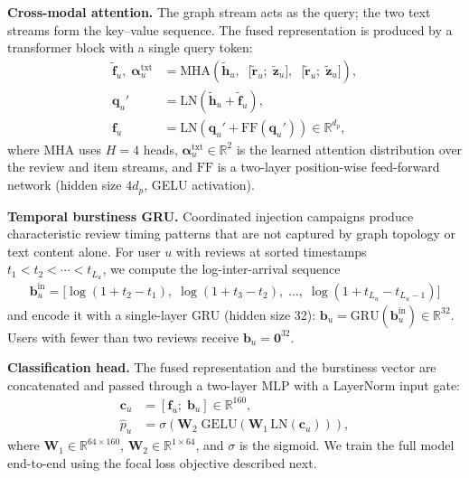 \textbf{Cross-modal attention.}
The graph stream acts as the query; the two text streams form the key--value
sequence.
The fused representation is produced by a transformer block with a single query
token:
\begin{align}
  \tilde{\mathbf{f}}_u,\; \boldsymbol{\alpha}_u^{\mathrm{txt}}
  &= \mathrm{MHA}\!\left(
       \tilde{\mathbf{h}}_u,\;\;
       \bigl[\tilde{\mathbf{r}}_u;\; \tilde{\mathbf{z}}_u\bigr],\;\;
       \bigl[\tilde{\mathbf{r}}_u;\; \tilde{\mathbf{z}}_u\bigr]
     \right), \label{eq:crossattn} \\[3pt]
  \mathbf{q}_u'
  &= \mathrm{LN}\!\left(\tilde{\mathbf{h}}_u + \tilde{\mathbf{f}}_u\right), \label{eq:addnorm1} \\
  \mathbf{f}_u
  &= \mathrm{LN}\!\left(\mathbf{q}_u' + \mathrm{FF}(\mathbf{q}_u')\right)
    \in \mathbb{R}^{d_p}, \label{eq:fusionout}
\end{align}
where $\mathrm{MHA}$ uses $H = 4$ heads, $\boldsymbol{\alpha}_u^{\mathrm{txt}}
\in \mathbb{R}^2$ is the learned attention distribution over the review and item
streams, and $\mathrm{FF}$ is a two-layer position-wise feed-forward network
(hidden size $4 d_p$, GELU activation).

\textbf{Temporal burstiness GRU.}
Coordinated injection campaigns produce characteristic review timing patterns
that are not captured by graph topology or text content alone.
For user $u$ with reviews at sorted timestamps $t_1 < t_2 < \cdots < t_{L_u}$,
we compute the log-inter-arrival sequence
\begin{align}
  \mathbf{b}_u^{\mathrm{in}}
  = \bigl[
      \log(1 + t_2 - t_1),\;
      \log(1 + t_3 - t_2),\;
      \ldots,\;
      \log(1 + t_{L_u} - t_{L_u - 1})
    \bigr]
  \label{eq:iat}
\end{align}
and encode it with a single-layer GRU (hidden size 32):
$\mathbf{b}_u = \mathrm{GRU}(\mathbf{b}_u^{\mathrm{in}}) \in \mathbb{R}^{32}$.
Users with fewer than two reviews receive $\mathbf{b}_u = \mathbf{0}^{32}$.

\textbf{Classification head.}
The fused representation and the burstiness vector are concatenated and passed
through a two-layer MLP with a LayerNorm input gate:
\begin{align}
  \mathbf{c}_u   &= [\mathbf{f}_u;\; \mathbf{b}_u] \in \mathbb{R}^{160},
  \label{eq:concat} \\
  \hat{p}_u      &= \sigma\!\left(
                      \mathbf{W}_2\;
                      \mathrm{GELU}\!\left(
                        \mathbf{W}_1\, \mathrm{LN}(\mathbf{c}_u)
                      \right)
                    \right),
  \label{eq:mlp}
\end{align}
where $\mathbf{W}_1 \in \mathbb{R}^{64 \times 160}$,
$\mathbf{W}_2 \in \mathbb{R}^{1 \times 64}$, and $\sigma$ is the sigmoid.
We train the full model end-to-end using the focal loss objective described next.

